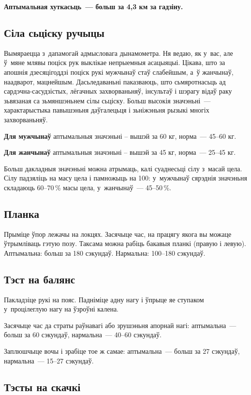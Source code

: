 \textbf{Аптымальная хуткасьць~--- больш за 4,3 км за гадзіну.}

\subsection*{Сіла сьціску ручыцы}

Вымяраецца з~дапамогай адмысловага дынамометра. Ня ведаю, як у~вас, але ў~мяне млявы поціск рук выклікае непрыемныя асацыяцыі. Цікава, што за апошнія дзесяцігоддзі поціск рукі мужчынаў стаў слабейшым, а~ў жанчынаў, наадварот, мацнейшым. Дасьледаваньні паказваюць, што сьмяротнасьць ад сардэчна-сасудзістых, лёгачных захворваньняў, інсультаў і шэрагу відаў раку зьвязаная са зьмяншэньнем сілы сьціску. Больш высокія значэньні~--- характарыстыка павышэньня даўгалецьця і зьніжэньня рызыкі многіх захворваньняў.

\textbf{Для мужчынаў} аптымальныя значэньні -- вышэй за 60 кг, норма~--- 45--60 кг. 

\textbf{Для жанчынаў} аптымальныя значэньні -- вышэй за 45 кг, норма~--- 25--45 кг. 

Больш дакладныя значэньні можна атрымаць, калі суаднесьці сілу з~масай цела. Сілу падзяліць на масу цела і памножыць на 100: у~мужчынаў сярэднія значэньня складаюць 60--70\,\% масы цела, у~жанчынаў~--- 45--50\,\%.

\subsection*{Планка}

Прыміце ўпор лежачы на локцях. Засячыце час, на працягу якога вы можаце ўтрымліваць гэтую позу. Таксама можна рабіць бакавыя планкі (правую і левую). Аптымальна: больш за 180 сэкундаў. Нармальна: 100--180 сэкундаў.

\subsection*{Тэст на балянс}

Пакладзіце рукі на пояс. Падніміце адну нагу і ўпрыце яе ступаком у~процілеглую нагу на ўзроўні калена. 

Засячыце час да страты раўнавагі або зрушэньня апорнай нагі: аптымальна~--- больш за 60 сэкундаў, нармальна~--- 40--60 сэкундаў. 

Заплюшчыце вочы і зрабіце тое ж самае: аптымальна~--- больш за 27 сэкундаў, нармальна~--- 15--27 сэкундаў.

\subsection*{Тэсты на скачкі}

